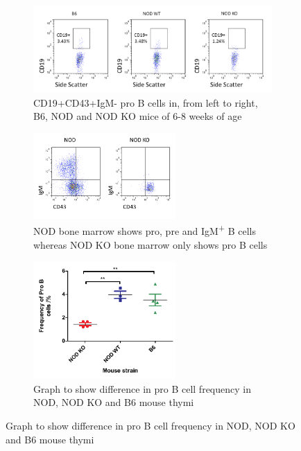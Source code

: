 \begin{figure}
	\begin{subfigure}{\textwidth}
	\includegraphics[width=\textwidth]{Figures/MatureBincproB.png}
	\caption{CD19+CD43+IgM- pro B cells in, from left to right, B6, NOD and NOD KO mice of 6-8 weeks of age}
	\end{subfigure}
	\begin{subfigure}{\textwidth}
	\centering
	\includegraphics[width=0.6\textwidth]{Figures/NODKOBM.png}
	\caption{NOD bone marrow shows pro, pre and IgM\textsuperscript{+} B cells whereas NOD KO bone marrow only shows pro B cells}
	\label{subfig:KOBM}
	\end{subfigure}
	\begin{subfigure}{\textwidth}
	\centering
	\includegraphics[width=0.6\textwidth]{Figures/MatureBincproBgraph.pdf}
	\caption{Graph to show difference in pro B cell frequency in NOD, NOD KO and B6 mouse thymi}
	\label{subfig:MatureBincproBgraph}

\end{subfigure}
\end{figure}

